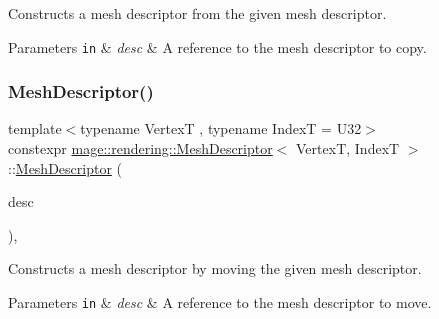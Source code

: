 Constructs a mesh descriptor from the given mesh descriptor.


\begin{DoxyParams}[1]{Parameters}
\mbox{\tt in}  & {\em desc} & A reference to the mesh descriptor to copy. \\
\hline
\end{DoxyParams}
\hypertarget{classmage_1_1rendering_1_1_mesh_descriptor_a929e3b4b29e421f921e5d17d0a382275}{}\label{classmage_1_1rendering_1_1_mesh_descriptor_a929e3b4b29e421f921e5d17d0a382275} 
\subsubsection{\texorpdfstring{Mesh\+Descriptor()}{MeshDescriptor()}\hspace{0.1cm}{\footnotesize\ttfamily [3/3]}}
{\footnotesize\ttfamily template$<$typename VertexT , typename IndexT  = U32$>$ \\
constexpr \hyperlink{classmage_1_1rendering_1_1_mesh_descriptor}{mage\+::rendering\+::\+Mesh\+Descriptor}$<$ VertexT, IndexT $>$\+::\hyperlink{classmage_1_1rendering_1_1_mesh_descriptor}{Mesh\+Descriptor} (\begin{DoxyParamCaption}\item[{\hyperlink{classmage_1_1rendering_1_1_mesh_descriptor}{Mesh\+Descriptor}$<$ VertexT, IndexT $>$ \&\&}]{desc }\end{DoxyParamCaption})\hspace{0.3cm}{\ttfamily [default]}, {\ttfamily [noexcept]}}

Constructs a mesh descriptor by moving the given mesh descriptor.


\begin{DoxyParams}[1]{Parameters}
\mbox{\tt in}  & {\em desc} & A reference to the mesh descriptor to move. \\
\hline
\end{DoxyParams}
\hypertarget{classmage_1_1rendering_1_1_mesh_descriptor_a0948d279801d1b4eb7eb5dca8b0f86ea}{}\label{classmage_1_1rendering_1_1_mesh_descriptor_a0948d279801d1b4eb7eb5dca8b0f86ea} 
